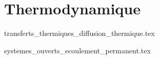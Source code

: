 \part{Thermodynamique}

{transferts_thermiques_diffusion_thermique.tex}

{systemes_ouverts_ecoulement_permanent.tex}